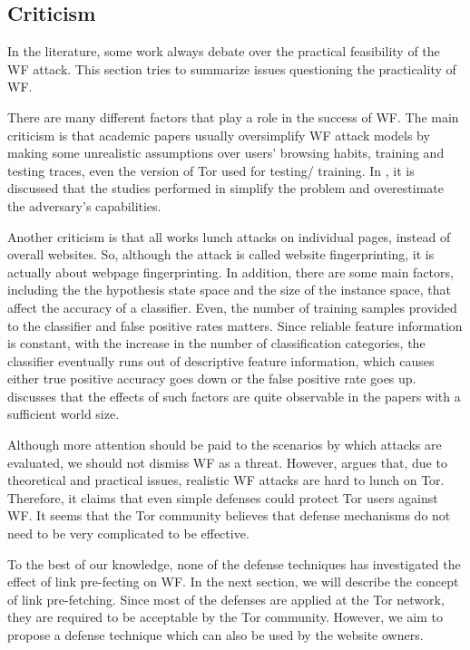  
\subsection{Criticism}
In the literature, some work always debate over the practical feasibility of the WF attack. This section tries to summarize issues questioning the practicality of WF.

There are many different factors that play a role in the success of WF. The main criticism is that academic papers usually oversimplify WF attack models by making some unrealistic assumptions over users' browsing habits, training and testing traces, even the version of Tor used for testing/ training. In \cite{juarez14}, it is discussed that the studies performed in \cite{cai2012touching, herrmann2009, panchenko11, wang2013improved, shi2009} simplify the problem and overestimate the adversary's capabilities.

Another criticism is that all works lunch attacks on individual pages, instead of overall websites. So, although the attack is called website fingerprinting, it is actually about webpage fingerprinting. In addition, there are some main factors, including the the hypothesis state space and the size of the instance space, that affect the accuracy of a classifier. Even, the number of training samples provided to the classifier and false positive rates matters. Since reliable feature information is constant, with the increase in the number of classification categories, the classifier eventually runs out of descriptive feature information, which causes either true positive accuracy goes down or the false positive rate goes up. \cite{TorBlog} discusses that the effects of such factors are quite observable in the papers with a sufficient world size.

Although more attention should be paid to the scenarios by which attacks are evaluated, we should not dismiss WF as a threat. However, \cite{TorBlog} argues that, due to theoretical and practical issues, realistic WF attacks are hard to lunch on Tor. Therefore, it claims that even simple defenses could protect Tor users against WF. It seems that the Tor community believes that defense mechanisms do not need to be very complicated to be effective.

To the best of our knowledge, none of the defense techniques has investigated the effect of link pre-fecting on WF. In the next section, we will describe the concept of link pre-fetching. Since most of the defenses are applied at the Tor network, they are required to be acceptable by the Tor community. However, we aim to propose a defense technique which can also be used by the website owners.

